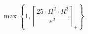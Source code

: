 \[\max\left\{ 1, \left\lceil \frac{25 \cdot H^{2} \cdot R^{2}}{\varepsilon^{2}} \right\rceil_{+} \right\}\]
